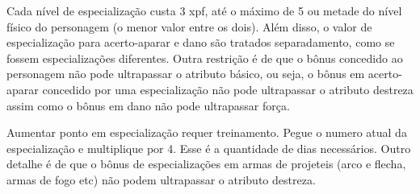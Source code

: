 Cada nível de especialização custa 3 xpf, até o máximo de 5 ou metade do nível físico do personagem (o menor valor entre os dois). Além disso, o valor de especialização para acerto-aparar e dano são tratados separadamento, como se fossem especializações diferentes. Outra restrição é de que o bônus concedido ao personagem não pode ultrapassar o atributo básico, ou seja, o bônus em acerto-aparar concedido por uma especialização não pode ultrapassar o atributo destreza assim como o bônus em dano não pode ultrapassar força. 






Aumentar ponto em especialização requer treinamento. Pegue o numero atual da especialização e multiplique por 4. Esse é a quantidade de dias necessários. Outro detalhe é de que o bônus de especializações em armas de projeteis (arco e flecha, armas de fogo etc) não podem ultrapassar o atributo destreza. 

